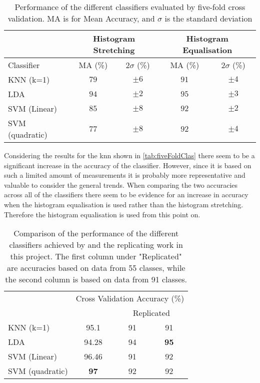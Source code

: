 \begin{table}[h]
\centering
\begin{tabular}{|l|c|c|c|c|}
\cline{2-5}
\multicolumn{1}{c|}{}&\multicolumn{2}{c|}{Histogram Stretching}&\multicolumn{2}{c|}{Histogram Equalisation}\\
\hline
Classifier&MA (\%)&$2\sigma$ (\%)&MA (\%)&$2\sigma$ (\%)\\
\hline
KNN (k=1)&$79$&$\pm 6$&$91$&$\pm4$\\
\hline
LDA&$94$&$\pm2$&$95$&$\pm3$\\
\hline
SVM (Linear)&$85$&$\pm8$&$92$&$\pm2$\\
\hline
SVM (quadratic)&$77$&$\pm8$&$92$&$\pm4$\\
\hline
\end{tabular}
\caption{Performance of the different classifiers evaluated by five-fold cross validation. MA is for Mean Accuracy, and $\sigma$ is the standard deviation}
\label{tab:fiveFoldClas}
\end{table} 
Considering the results for the \gls{knn} shown in \autoref{tab:fiveFoldClas} there seem to be a significant increase in the accuracy of the classifier. However, since it is based on such a limited amount of measurements it is probably more representative and valuable to consider the general trends. When comparing the two accuracies across all of the classifiers there seem to be evidence for an increase in accuracy when the histogram equalisation is used rather than the histogram stretching. Therefore the histogram equalisation is used from this point on. 
\begin{table}[h]
\centering
\begin{tabular}{|l|c|c|c|}
\cline{2-4}
\multicolumn{1}{c|}{}&\multicolumn{3}{c|}{Cross Validation Accuracy (\%)}\\
\cline{2-4}
\multicolumn{1}{c|}{}&\cite{Khan2017a}&\multicolumn{2}{c|}{Replicated}\\
\hline
KNN (k=1)&95.1&91&91\\
\hline
LDA&94.28&94&\textbf{95}\\
\hline
SVM (Linear)&96.46&91&92\\
\hline
SVM (quadratic)&\textbf{97}&92&92\\
\hline
\end{tabular}
\caption{Comparison of the performance of the different classifiers achieved by \cite{Khan2017a} and the replicating work in this project. The first column under "Replicated" are accuracies based on data from 55 classes, while the second column is based on data from 91 classes.}
\label{tab:fiveFoldClasCompare}
\end{table} 

